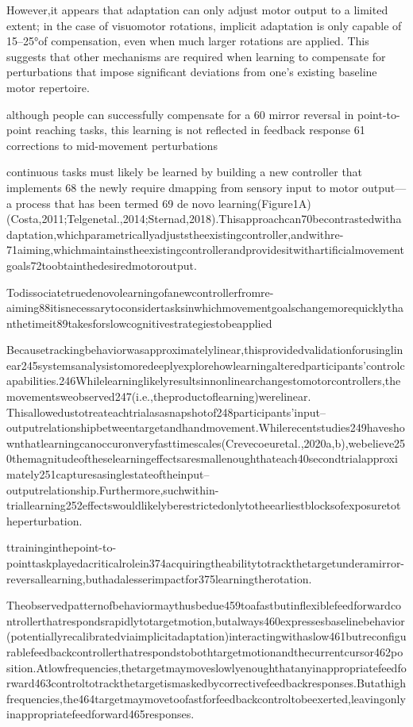 \documentclass[../main.tex]{subfiles}
\begin{document}
{{However,it appears that adaptation can only adjust motor output to a limited extent; in the case of visuomotor rotations, implicit adaptation is only capable of 15–25°of compensation, even when much larger rotations are applied. This suggests that other mechanisms are required when learning to compensate for perturbations that impose significant deviations from one’s existing baseline motor repertoire.

although people can successfully compensate for a 60 mirror reversal in point-to-point reaching tasks, this learning is not reflected in feedback response 61 corrections to mid-movement perturbations

continuous tasks must likely be learned by building a new controller that implements 68 the newly require dmapping from sensory input to motor output—a process that has been termed 69 de novo learning(Figure1A)(Costa,2011;Telgenetal.,2014;Sternad,2018).Thisapproachcan70becontrastedwithadaptation,whichparametricallyadjuststheexistingcontroller,andwithre-71aiming,whichmaintainstheexistingcontrollerandprovidesitwithartificialmovementgoals72toobtainthedesiredmotoroutput.

Todissociatetruedenovolearningofanewcontrollerfromre-aiming88itisnecessarytoconsidertasksinwhichmovementgoalschangemorequicklythanthetimeit89takesforslowcognitivestrategiestobeapplied

Becausetrackingbehaviorwasapproximatelylinear,thisprovidedvalidationforusinglinear245systemsanalysistomoredeeplyexplorehowlearningalteredparticipants’controlcapabilities.246Whilelearninglikelyresultsinnonlinearchangestomotorcontrollers,themovementsweobserved247(i.e.,theproductoflearning)werelinear. Thisallowedustotreateachtrialasasnapshotof248participants’input–outputrelationshipbetweentargetandhandmovement.Whilerecentstudies249haveshownthatlearningcanoccuronveryfasttimescales(Crevecoeuretal.,2020a,b),webelieve250themagnitudeoftheselearningeffectsaresmallenoughthateach40secondtrialapproximately251capturesasinglestateoftheinput–outputrelationship.Furthermore,suchwithin-triallearning252effectswouldlikelyberestrictedonlytotheearliestblocksofexposuretotheperturbation.

ttraininginthepoint-to-pointtaskplayedacriticalrolein374acquiringtheabilitytotrackthetargetunderamirror-reversallearning,buthadalesserimpactfor375learningtherotation.

Theobservedpatternofbehaviormaythusbedue459toafastbutinflexiblefeedforwardcontrollerthatrespondsrapidlytotargetmotion,butalways460expressesbaselinebehavior(potentiallyrecalibratedviaimplicitadaptation)interactingwithaslow461butreconfigurablefeedbackcontrollerthatrespondstobothtargetmotionandthecurrentcursor462position.Atlowfrequencies,thetargetmaymoveslowlyenoughthatanyinappropriatefeedforward463controltotrackthetargetismaskedbycorrectivefeedbackresponses.Butathighfrequencies,the464targetmaymovetoofastforfeedbackcontroltobeexerted,leavingonlyinappropriatefeedforward465responses.

}}
\end{document}
